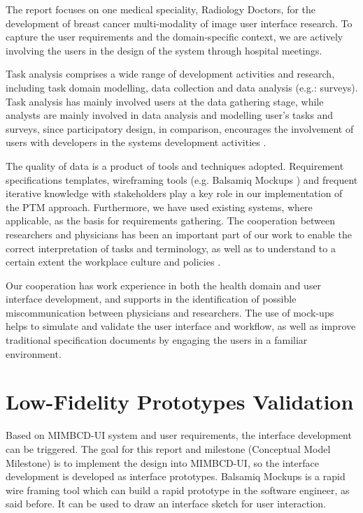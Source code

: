 The report focuses on one medical speciality, Radiology Doctors, for the development of breast cancer multi-modality of image user interface research. To capture the user requirements and the domain-specific context, we are actively involving the users in the design of the system through hospital meetings.

Task analysis comprises a wide range of development activities and research, including task domain modelling, data collection and data analysis (e.g.: surveys). Task analysis has mainly involved users at the data gathering stage, while analysts are mainly involved in data analysis and modelling user's tasks and surveys, since participatory design, in comparison, encourages the involvement of users with developers in the systems development activities \cite{muller1993taxonomy}.

The quality of data is a product of tools and techniques adopted. Requirement specifications templates, wireframing tools (e.g. Balsamiq Mockups \cite{balsamiqMockups}) and frequent iterative knowledge with stakeholders play a key role in our implementation of the PTM approach. Furthermore, we have used existing systems, where applicable, as the basis for requirements gathering. The cooperation between researchers and physicians has been an important part of our work to enable the correct interpretation of tasks and terminology, as well as to understand to a certain extent the workplace culture and policies \cite{williams1993translation}.

Our cooperation has work experience in both the health domain and user interface development, and supports in the identification of possible miscommunication between physicians and researchers. The use of mock-ups helps to simulate and validate the user interface and workflow, as well as improve traditional specification documents by engaging the users in a familiar environment.

\clearpage

\section{Low-Fidelity Prototypes Validation}

Based on MIMBCD-UI system and user requirements, the interface development can be triggered. The goal for this report and milestone (Conceptual Model Milestone) is to implement the design into MIMBCD-UI, so the interface development is developed as interface prototypes. Balsamiq Mockups \cite{Balsamiq} is a rapid wire framing tool which can build a rapid prototype in the software engineer, as said before. It can be used to draw an interface sketch for user interaction.

